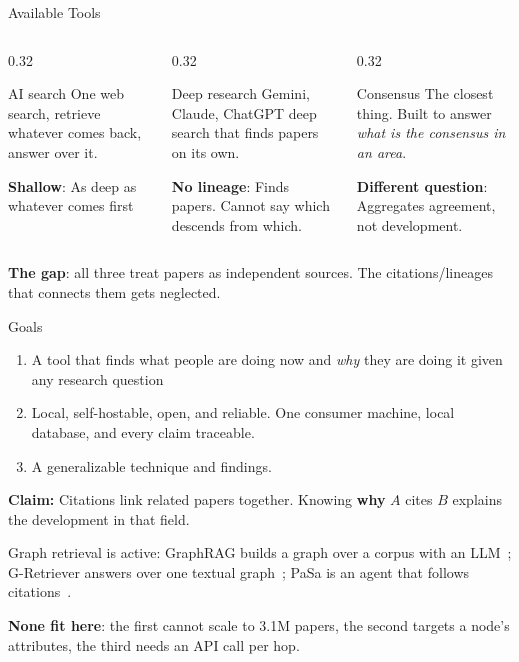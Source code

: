 \documentclass[aspectratio=169, 11pt]{beamer}
\let\oldtextbf\textbf
\renewcommand{\textbf}[1]{{\color{ktertiary}\oldtextbf{#1}}}
\let\oldemph\emph
\renewcommand{\emph}[1]{{\color{ksecondary}\oldemph{#1}}}
\begin{document}
\begin{frame}{Available Tools}
  \begin{columns}[T]
    \begin{column}{0.32\textwidth}
      \begin{kbox}[equal height group=tools]{AI search}
        One web search, retrieve whatever comes back, answer over it.
        
        \textbf{Shallow}: As deep as whatever comes first
      \end{kbox}
    \end{column}
    \begin{column}{0.32\textwidth}
      \begin{kbox}[equal height group=tools]{Deep research}
        Gemini, Claude, ChatGPT deep search that finds papers on its own.
        
        \textbf{No lineage}: Finds papers. Cannot say which descends from which.
      \end{kbox}
    \end{column}
    \begin{column}{0.32\textwidth}
      \begin{kbox}[equal height group=tools]{Consensus}
        The closest thing. Built to answer \emph{what is the consensus in an area}.

        \textbf{Different question}: Aggregates agreement, not development.
      \end{kbox}
    \end{column}
  \end{columns}

  \textbf{The gap}: all three treat papers as independent sources. The citations/lineages that connects them gets neglected.
\end{frame}

\begin{frame}{Goals}
  \begin{enumerate}
    \item A tool that finds what people are doing now and \emph{why} they are doing it given any research question
    \item Local, self-hostable, open, and reliable. One consumer machine, local database, and every claim traceable.
    \item A generalizable technique and findings.
  \end{enumerate}

  \textbf{Claim:} Citations link related papers together. Knowing \textbf{why} $A$ cites $B$ explains the development in that field.

  Graph retrieval is active: GraphRAG builds a graph over a corpus with an
  LLM~\cite{graphrag_local_global}; G-Retriever answers over one textual
  graph~\cite{gretriever}; PaSa is an agent that follows citations~\cite{pasa}.

  \textbf{None fit here}: the first cannot scale to 3.1M papers, the second targets a node's
  attributes, the third needs an API call per hop.

\end{frame}
\end{document}
